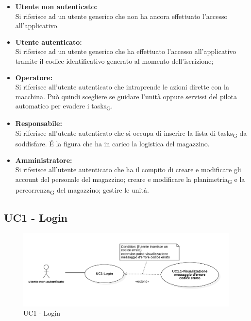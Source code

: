 \begin{itemize}
	\item{\textbf{Utente non autenticato:}\\
	Si riferisce ad un utente generico che non ha ancora effettuato l'accesso all'applicativo.}
	\item{\textbf{Utente autenticato:}\\
	Si riferisce ad un utente generico che ha effettuato l'accesso all'applicativo tramite il codice identificativo generato al momento dell'iscrizione;}
	\item{\textbf{Operatore:}\\
	Si riferisce all'utente autenticato che intraprende le azioni dirette con la macchina. Può quindi scegliere se guidare l'unità oppure servissi del pilota automatico per evadere i \glspl{task}\textsubscript{G}.}
	\item{\textbf{Responsabile:}\\
	Si riferisce all'utente autenticato che si occupa di inserire la lista di \glspl{task}\textsubscript{G} da soddisfare. \'E la figura che ha in carico la logistica del magazzino.}
	\item{\textbf{Amministratore:}\\
	Si riferisce all'utente autenticato che ha il compito di creare e modificare gli account del personale del magazzino; creare e modificare la \gls{planimetria}\textsubscript{G} e la \gls{percorrenza}\textsubscript{G} del magazzino; gestire le unità.}
\end{itemize}

\subsection{UC1 - Login}
\begin{figure}[H]
	\centering
	\includegraphics[scale=0.52]{res/images/uc1.png}
	\caption{UC1 - Login}
\end{figure}


